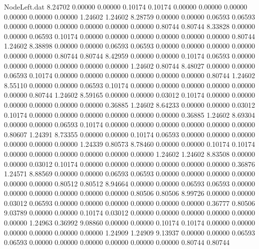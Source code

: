 \begin{filecontents}{NodeLeft.dat}
   8.24702    0.00000    0.00000     0.10174    0.10174    0.00000    0.00000    0.00000    0.00000    0.00000    0.00000    1.24602    1.24602
   8.28759    0.00000    0.00000     0.06593    0.06593    0.00000    0.00000    0.00000    0.00000    0.00000    0.00000    0.80744    0.80744
   8.33828    0.00000    0.00000     0.06593    0.10174    0.00000    0.00000    0.00000    0.00000    0.00000    0.00000    0.80744    1.24602
   8.38898    0.00000    0.00000     0.06593    0.06593    0.00000    0.00000    0.00000    0.00000    0.00000    0.00000    0.80744    0.80744
   8.42959    0.00000    0.00000     0.10174    0.06593    0.00000    0.00000    0.00000    0.00000    0.00000    0.00000    1.24602    0.80744
   8.48027    0.00000    0.00000     0.06593    0.10174    0.00000    0.00000    0.00000    0.00000    0.00000    0.00000    0.80744    1.24602
   8.55110    0.00000    0.00000     0.06593    0.10174    0.00000    0.00000    0.00000    0.00000    0.00000    0.00000    0.80744    1.24602
   8.59165    0.00000    0.00000     0.03012    0.10174    0.00000    0.00000    0.00000    0.00000    0.00000    0.00000    0.36885    1.24602
   8.64233    0.00000    0.00000     0.03012    0.10174    0.00000    0.00000    0.00000    0.00000    0.00000    0.00000    0.36885    1.24602
   8.69304    0.00000    0.00000     0.06593    0.10174    0.00000    0.00000    0.00000    0.00000    0.00000    0.00000    0.80607    1.24391
   8.73355    0.00000    0.00000     0.10174    0.06593    0.00000    0.00000    0.00000    0.00000    0.00000    0.00000    1.24339    0.80573
   8.78460    0.00000    0.00000     0.10174    0.10174    0.00000    0.00000    0.00000    0.00000    0.00000    0.00000    1.24602    1.24602
   8.83508    0.00000    0.00000     0.03012    0.10174    0.00000    0.00000    0.00000    0.00000    0.00000    0.00000    0.36876    1.24571
   8.88569    0.00000    0.00000     0.06593    0.06593    0.00000    0.00000    0.00000    0.00000    0.00000    0.00000    0.80512    0.80512
   8.94664    0.00000    0.00000     0.06593    0.06593    0.00000    0.00000    0.00000    0.00000    0.00000    0.00000    0.80506    0.80506
   8.99726    0.00000    0.00000     0.03012    0.06593    0.00000    0.00000    0.00000    0.00000    0.00000    0.00000    0.36777    0.80506
   9.03789    0.00000    0.00000     0.10174    0.03012    0.00000    0.00000    0.00000    0.00000    0.00000    0.00000    1.24963    0.36992
   9.08860    0.00000    0.00000     0.10174    0.10174    0.00000    0.00000    0.00000    0.00000    0.00000    0.00000    1.24909    1.24909
   9.13937    0.00000    0.00000     0.06593    0.06593    0.00000    0.00000    0.00000    0.00000    0.00000    0.00000    0.80744    0.80744

\end{filecontents}
